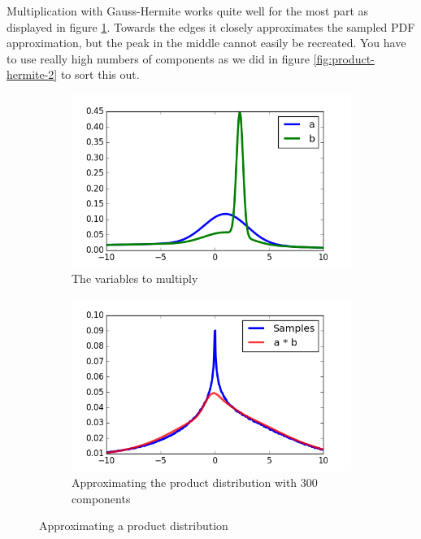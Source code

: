 \documentclass[11pt,a4paper]{book}
\begin{document}
Multiplication with Gauss-Hermite works quite well for the most part as
displayed in figure \ref{fig:product-hermite}. Towards the edges it closely
approximates the sampled PDF approximation, but the peak in the middle cannot
easily be recreated. You have to use really high numbers of components as we did
in figure \ref{fig:product-hermite-2} to sort this out.
\begin{figure}[h]
  \centering
  \begin{subfigure}[t]{0.45\textwidth}
    \centering
    \includegraphics[width=\textwidth]{thesis/operations/product-hermite-vars}
    \caption{The variables to multiply}
  \end{subfigure}
  \hfill
  \begin{subfigure}[t]{0.45\textwidth}
    \centering
    \includegraphics[width=\textwidth]{thesis/operations/product-hermite-50-components}
    \caption{Approximating the product distribution with $300$ components}
  \end{subfigure}
  \caption{Approximating a product distribution}
  \label{fig:product-hermite}
\end{figure}
\end{document}
